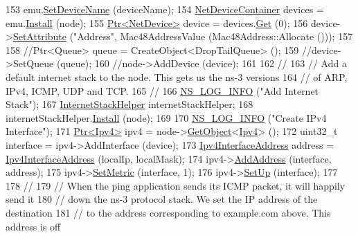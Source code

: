\begin{DoxyCode}
153   emu.\hyperlink{classns3_1_1EmuFdNetDeviceHelper_aa5c26a78442e507ba969f28ffa5f748e}{SetDeviceName} (deviceName);
154   \hyperlink{classns3_1_1NetDeviceContainer}{NetDeviceContainer} devices = emu.\hyperlink{classns3_1_1FdNetDeviceHelper_af70d55cbb4f6411c33cacb84eb651ad5}{Install} (node);
155   \hyperlink{classns3_1_1Ptr}{Ptr<NetDevice>} device = devices.\hyperlink{classns3_1_1NetDeviceContainer_a677d62594b5c9d2dea155cc5045f4d0b}{Get} (0);
156   device->\hyperlink{classns3_1_1ObjectBase_ac60245d3ea4123bbc9b1d391f1f6592f}{SetAttribute} (\textcolor{stringliteral}{"Address"}, Mac48AddressValue (Mac48Address::Allocate ()));
157 
158   \textcolor{comment}{//Ptr<Queue> queue = CreateObject<DropTailQueue> ();}
159   \textcolor{comment}{//device->SetQueue (queue);}
160   \textcolor{comment}{//node->AddDevice (device);}
161 
162   \textcolor{comment}{//}
163   \textcolor{comment}{// Add a default internet stack to the node.  This gets us the ns-3 versions}
164   \textcolor{comment}{// of ARP, IPv4, ICMP, UDP and TCP.}
165   \textcolor{comment}{//}
166   \hyperlink{group__logging_gafbd73ee2cf9f26b319f49086d8e860fb}{NS\_LOG\_INFO} (\textcolor{stringliteral}{"Add Internet Stack"});
167   \hyperlink{classns3_1_1InternetStackHelper}{InternetStackHelper} internetStackHelper;
168   internetStackHelper.\hyperlink{classns3_1_1InternetStackHelper_a6645b412f31283d2d9bc3d8a95cebbc0}{Install} (node);
169 
170   \hyperlink{group__logging_gafbd73ee2cf9f26b319f49086d8e860fb}{NS\_LOG\_INFO} (\textcolor{stringliteral}{"Create IPv4 Interface"});
171   \hyperlink{classns3_1_1Ptr}{Ptr<Ipv4>} ipv4 = node->\hyperlink{classns3_1_1Object_a13e18c00017096c8381eb651d5bd0783}{GetObject}<\hyperlink{classns3_1_1Ipv4}{Ipv4}> ();
172   uint32\_t \textcolor{keyword}{interface }= ipv4->AddInterface (device);
173   \hyperlink{classns3_1_1Ipv4InterfaceAddress}{Ipv4InterfaceAddress} address = \hyperlink{classns3_1_1Ipv4InterfaceAddress}{Ipv4InterfaceAddress} (localIp, 
      localMask);
174   ipv4->\hyperlink{classns3_1_1Ipv4_ad203526cae6a4b86f1bb89e44d2b62f7}{AddAddress} (interface, address);
175   ipv4->\hyperlink{classns3_1_1Ipv4_a2b5632573b67957fabe2dfea248a57a3}{SetMetric} (interface, 1);
176   ipv4->\hyperlink{classns3_1_1Ipv4_a71b2f8acca4923aef907b50b3196bf23}{SetUp} (interface);
177 
178   \textcolor{comment}{//}
179   \textcolor{comment}{// When the ping application sends its ICMP packet, it will happily send it}
180   \textcolor{comment}{// down the ns-3 protocol stack.  We set the IP address of the destination}
181   \textcolor{comment}{// to the address corresponding to example.com above.  This address is off}

\end{DoxyCode}
